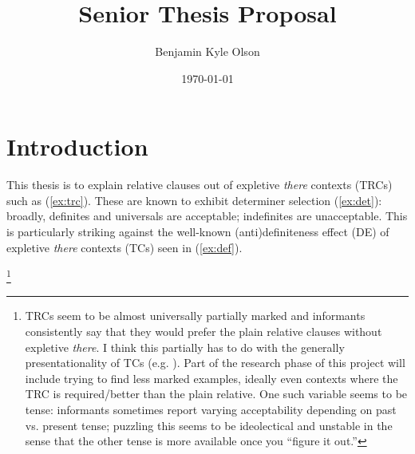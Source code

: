 \documentclass[11pt]{article}
\title{Senior Thesis Proposal}
\author{Benjamin Kyle Olson}
\date{\today}
\begin{document}
\maketitle

\section{Introduction}

This thesis is to explain relative clauses out of expletive \textit{there} contexts (TRCs) such as (\ref{ex:trc}). These are known to exhibit determiner selection (\ref{ex:det}): broadly, definites and universals are acceptable; indefinites are unacceptable. This is particularly striking against the well-known (anti)definiteness effect (DE) of expletive \textit{there} contexts (TCs) seen in (\ref{ex:def}).

\begin{exe}
	\label{ex:trc}\footnote{\label{fn:intro}TRCs seem to be almost universally partially marked and informants consistently say that they would prefer the plain relative clauses without expletive \textit{there}. I think this partially has to do with the generally presentationality of TCs (e.g. \cite{zucchiIngredientsDefinitenessDefiniteness1995}). Part of the research phase of this project will include trying to find less marked examples, ideally even contexts where the TRC is required/better than the plain relative. One such variable seems to be tense: informants sometimes report varying acceptability depending on past vs. present tense; puzzling this seems to be ideolectical and unstable in the sense that the other tense is more available once you ``figure it out.''}
	\label{ex:det}
	\label{ex:def}
\end{exe}
\end{document}
